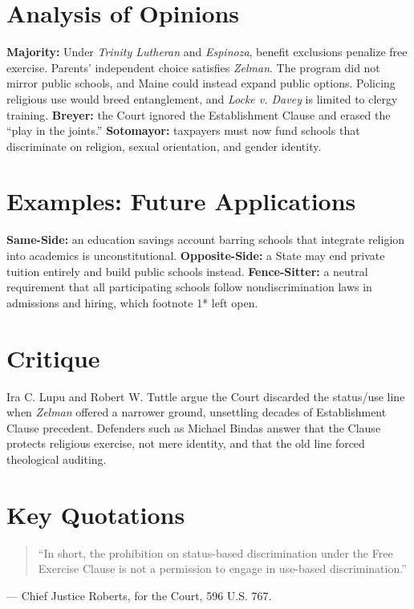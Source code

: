 \documentclass[12pt]{article}
\begin{document}
\section{Analysis of Opinions}
\textbf{Majority:} Under \textit{Trinity Lutheran} and \textit{Espinoza}, benefit exclusions penalize free exercise. Parents' independent choice satisfies \textit{Zelman}. The program did not mirror public schools, and Maine could instead expand public options. Policing religious use would breed entanglement, and \textit{Locke v. Davey} is limited to clergy training. \textbf{Breyer:} the Court ignored the Establishment Clause and erased the ``play in the joints.'' \textbf{Sotomayor:} taxpayers must now fund schools that discriminate on religion, sexual orientation, and gender identity.

\section{Examples: Future Applications}
\textbf{Same-Side:} an education savings account barring schools that integrate religion into academics is unconstitutional. \textbf{Opposite-Side:} a State may end private tuition entirely and build public schools instead. \textbf{Fence-Sitter:} a neutral requirement that all participating schools follow nondiscrimination laws in admissions and hiring, which footnote 1* left open.

\section{Critique}
Ira C. Lupu and Robert W. Tuttle argue the Court discarded the status/use line when \textit{Zelman} offered a narrower ground, unsettling decades of Establishment Clause precedent. Defenders such as Michael Bindas answer that the Clause protects religious exercise, not mere identity, and that the old line forced theological auditing.

\section{Key Quotations}
\begin{quote}
``In short, the prohibition on status-based discrimination under the Free Exercise Clause is not a permission to engage in use-based discrimination.''
\end{quote}
\noindent --- Chief Justice Roberts, for the Court, 596 U.S. 767.
\end{document}
